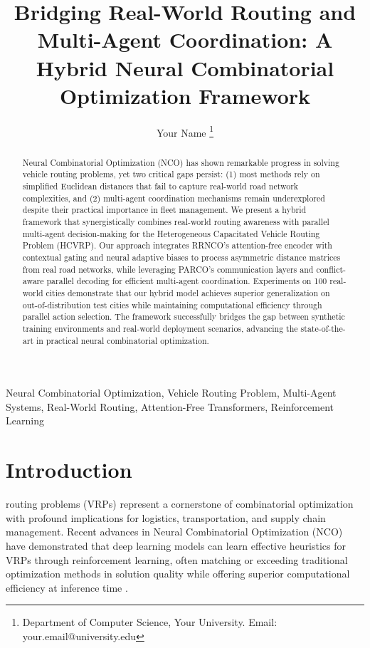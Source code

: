 \documentclass[lettersize,journal]{IEEEtran}
\begin{document}
\title{Bridging Real-World Routing and Multi-Agent Coordination: A Hybrid Neural Combinatorial Optimization Framework}

\author{Your Name
\thanks{Department of Computer Science, Your University. Email: your.email@university.edu}}

\maketitle

\begin{abstract}
Neural Combinatorial Optimization (NCO) has shown remarkable progress in solving vehicle routing problems, yet two critical gaps persist: (1) most methods rely on simplified Euclidean distances that fail to capture real-world road network complexities, and (2) multi-agent coordination mechanisms remain underexplored despite their practical importance in fleet management. We present a hybrid framework that synergistically combines real-world routing awareness with parallel multi-agent decision-making for the Heterogeneous Capacitated Vehicle Routing Problem (HCVRP). Our approach integrates RRNCO's attention-free encoder with contextual gating and neural adaptive biases to process asymmetric distance matrices from real road networks, while leveraging PARCO's communication layers and conflict-aware parallel decoding for efficient multi-agent coordination. Experiments on 100 real-world cities demonstrate that our hybrid model achieves superior generalization on out-of-distribution test cities while maintaining computational efficiency through parallel action selection. The framework successfully bridges the gap between synthetic training environments and real-world deployment scenarios, advancing the state-of-the-art in practical neural combinatorial optimization.
\end{abstract}

\begin{IEEEkeywords}
Neural Combinatorial Optimization, Vehicle Routing Problem, Multi-Agent Systems, Real-World Routing, Attention-Free Transformers, Reinforcement Learning
\end{IEEEkeywords}

\section{Introduction}

 routing problems (VRPs) represent a cornerstone of combinatorial optimization with profound implications for logistics, transportation, and supply chain management. Recent advances in Neural Combinatorial Optimization (NCO) have demonstrated that deep learning models can learn effective heuristics for VRPs through reinforcement learning, often matching or exceeding traditional optimization methods in solution quality while offering superior computational efficiency at inference time \cite{kool2018attention,kwon2020pomo,kim2022symnco}.
\end{document}
